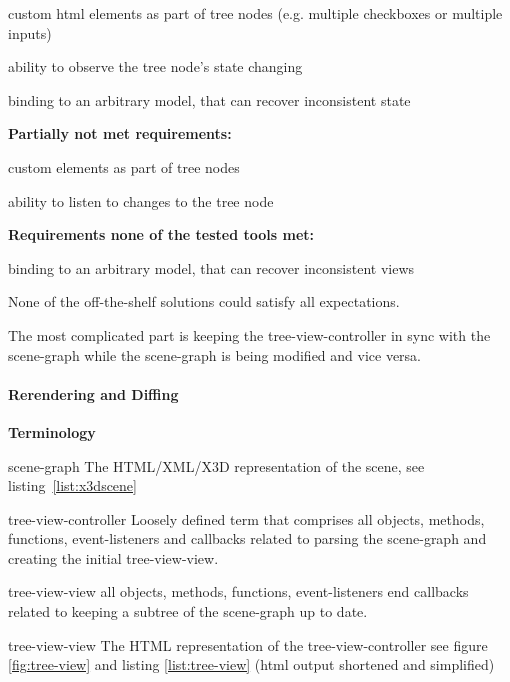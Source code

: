 \begin{enumerate*}
  \item custom html elements as part of tree nodes (e.g. multiple checkboxes or multiple inputs)
  \item ability to observe the tree node's state changing
  \item binding to an arbitrary model, that can recover inconsistent state
\end{enumerate*}

\textbf{Partially not met requirements:}

\begin{itemize*}
  \item custom elements as part of tree nodes
  \item ability to listen to changes to the tree node
\end{itemize*}

\textbf{Requirements none of the tested tools met:}

\begin{itemize*}
  \item binding to an arbitrary model, that can recover inconsistent views
\end{itemize*}

None of the off-the-shelf solutions could satisfy all expectations.

The most complicated part is keeping the tree-view-controller in sync
with the scene-graph while the scene-graph is being modified and vice
versa.

\clearpage
\paragraph{Rerendering and Diffing}
\label{rerendering-and-diffing}

\textbf{Terminology}

\begin{description*}
  \item[scene-graph]
    The HTML/XML/X3D representation of the scene, see listing~\ref{list:x3dscene}
  \item[tree-view-controller]
    Loosely defined term that comprises all objects, methods, functions,
    event-listeners and callbacks related to parsing the scene-graph and
    creating the initial tree-view-view.
  \item[tree-view-view]
    all objects, methods, functions, event-listeners end callbacks related
    to keeping a subtree of the scene-graph up to date.
  \item[tree-view-view]
    The HTML representation of the tree-view-controller see figure \ref{fig:tree-view} and listing \ref{list:tree-view} (html output
    shortened and simplified)
\end{description*}

